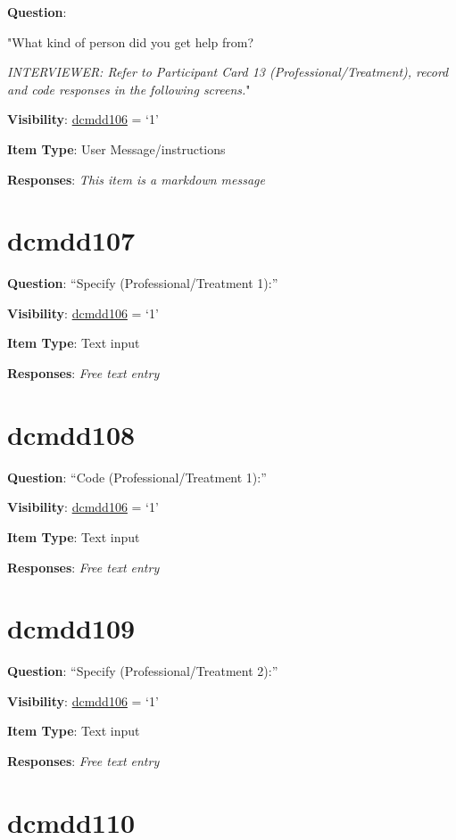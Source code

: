 \documentclass[]{book}
\begin{document}
\textbf{Question}:

"What kind of person did you get help from?

\emph{INTERVIEWER: Refer to Participant Card 13 (Professional/Treatment), record and code responses in the following screens.}"

\textbf{Visibility}: \protect\hyperlink{dcmdd106}{dcmdd106} = `1'

\textbf{Item Type}: User Message/instructions

\textbf{Responses}: \emph{This item is a markdown message}

\hypertarget{dcmdd107}{%
\section{dcmdd107}\label{dcmdd107}}

\textbf{Question}: ``Specify (Professional/Treatment 1):''

\textbf{Visibility}: \protect\hyperlink{dcmdd106}{dcmdd106} = `1'

\textbf{Item Type}: Text input

\textbf{Responses}: \emph{Free text entry}

\hypertarget{dcmdd108}{%
\section{dcmdd108}\label{dcmdd108}}

\textbf{Question}: ``Code (Professional/Treatment 1):''

\textbf{Visibility}: \protect\hyperlink{dcmdd106}{dcmdd106} = `1'

\textbf{Item Type}: Text input

\textbf{Responses}: \emph{Free text entry}

\hypertarget{dcmdd109}{%
\section{dcmdd109}\label{dcmdd109}}

\textbf{Question}: ``Specify (Professional/Treatment 2):''

\textbf{Visibility}: \protect\hyperlink{dcmdd106}{dcmdd106} = `1'

\textbf{Item Type}: Text input

\textbf{Responses}: \emph{Free text entry}

\hypertarget{dcmdd110}{%
\section{dcmdd110}\label{dcmdd110}}
\end{document}
